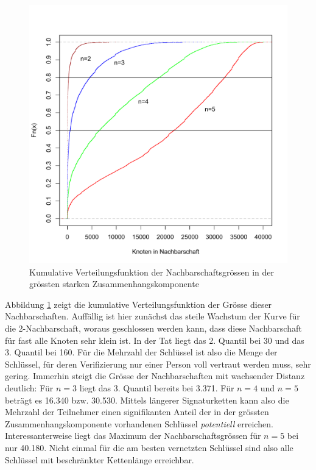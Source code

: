 \begin{figure}[th!]
  \centering
  \includegraphics[scale=0.6]{images/neighbourhood-cdf.pdf}
  \caption{Kumulative Verteilungsfunktion der Nachbarschaftsgr\"ossen
    in der gr\"ossten starken Zusammenhangskomponente}
  \label{fig:neighbourhood-cdf}
\end{figure}

Abbildung \ref{fig:neighbourhood-cdf} zeigt die kumulative
Verteilungsfunktion der Gr\"osse dieser Nachbarschaften. Auff\"allig
ist hier zun\"achst das steile Wachstum der Kurve f\"ur die
2-Nachbarschaft, woraus geschlossen werden kann, dass diese
Nachbarschaft f\"ur fast alle Knoten sehr klein ist. In der Tat liegt
das 2. Quantil bei 30 und das 3. Quantil bei 160. F\"ur die Mehrzahl
der Schl\"ussel ist also die Menge der Schl\"ussel, f\"ur deren
Verifizierung nur einer Person voll vertraut werden muss, sehr
gering. Immerhin steigt die Gr\"osse der Nachbarschaften mit
wachsender Distanz deutlich: F\"ur $n=3$ liegt das 3. Quantil bereits
bei 3.371. F\"ur $n=4$ und $n=5$ betr\"agt es 16.340 bzw. 30.530. Mittels
l\"angerer Signaturketten kann also die Mehrzahl der Teilnehmer einen
signifikanten Anteil der in der gr\"ossten Zusammenhangskomponente
vorhandenen Schl\"ussel \emph{potentiell}
erreichen. Interessanterweise liegt das Maximum der
Nachbarschaftsgr\"ossen f\"ur $n=5$ bei nur 40.180. Nicht einmal f\"ur
die am besten vernetzten Schl\"ussel sind also alle Schl\"ussel mit
beschr\"ankter Kettenl\"ange erreichbar.

